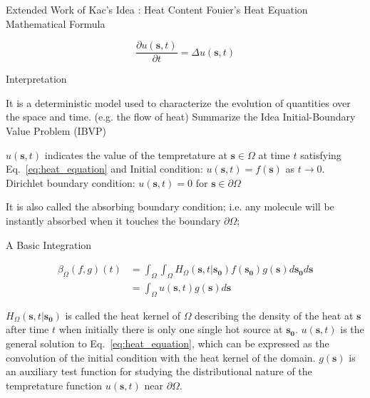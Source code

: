 \documentclass{article}
\begin{document}
\begin{outline}[enumerate]
  \newpage


  \1 Extended Work of Kac’s Idea \cite{desjardins1994heat}\cite{vandenberg1994heat}: Heat Content
    \2 Fouier's Heat Equation \cite{baron1878analytical}
     \3 Mathematical Formula
        \par
        \begin{equation}\label{eq:heat_equation}
          \frac{\partial u(\bm{s}, t)}{\partial t} = \Delta u(\bm{s}, t)
        \end{equation}
        
      \3 Interpretation
      \par
      It is a deterministic model used to characterize the evolution of quantities over the space and time. (e.g. the flow of heat)
    \2 Summarize the Idea
      \3 Initial-Boundary Value Problem (IBVP)
        \par
        $u(\bm{s}, t)$ indicates the value of the tempretature at $\bm{s} \in \Omega$ at time $t$ satisfying Eq.~\ref{eq:heat_equation} and 
         \4 Initial condition: $u(\bm{s}, t) = f(\bm{s})$ as $t \rightarrow 0$.
         \4 Dirichlet boundary condition: $u(\bm{s}, t)=0$ for $\bm{s} \in \partial \Omega$
         \par
         It is also called the absorbing boundary condition; i.e. any molecule will be instantly absorbed when it touches the boundary $\partial \Omega$;
         
      \3 A Basic Integration
         \par
          \begin{align}
            \beta_{\Omega}(f, g)(t) &= \int_{\Omega} \int_{\Omega} H_{\Omega}(\bm{s}, t | \bm{s_0}) f(\bm{s_0}) g(\bm{s}) d\bm{s_0} d\bm{s} \label{eq:integral_full} \\
            &= \int_{\Omega} u(\bm{s}, t) g(\bm{s}) d\bm{s} \label{eq:integral_convol}
          \end{align}
         
        \4 $H_{\Omega}(\bm{s}, t | \bm{s_0})$ is called the heat kernel of $\Omega$ describing the density of the heat at $\bm{s}$ after time $t$ when initially there is only one single hot source at $\bm{s_0}$. 
        \4 $u(\bm{s}, t)$ is the general solution to Eq.~\ref{eq:heat_equation}, which can be expressed as the convolution of the initial condition with the heat kernel of the domain.
        \4 $g(\bm{s})$ is an auxiliary test function for studying the distributional nature of the tempretature function $u(\bm{s}, t)$ near $\partial \Omega$. 


\end{outline}
\end{document}
